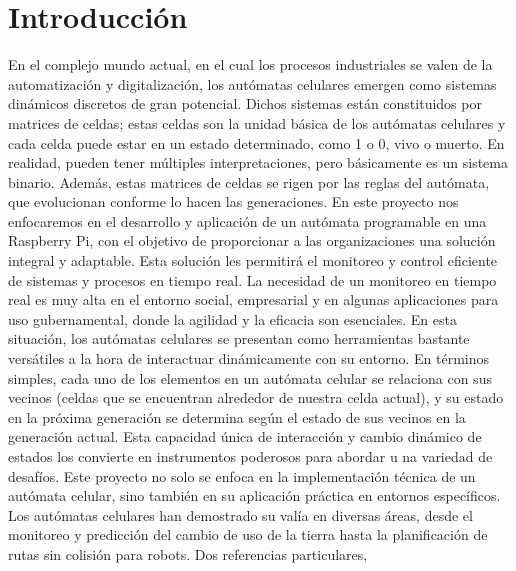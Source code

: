 \section{Introducci\'on}
\label{sec:introduccion}
    En el complejo mundo actual, en el cual los procesos industriales se valen de la automatizaci\'on y digitalizaci\'on, 
        los aut\'omatas celulares emergen como sistemas din\'amicos discretos de gran potencial. Dichos sistemas est\'an 
        constituidos por matrices de celdas; estas celdas son la unidad b\'asica de los aut\'omatas celulares y cada celda 
        puede estar en un estado determinado, como 1 o 0, vivo o muerto. En realidad, pueden tener m\'ultiples 
        interpretaciones, pero b\'asicamente es un sistema binario. Adem\'as, estas matrices de celdas se rigen 
        por las reglas del aut\'omata, que evolucionan conforme lo hacen las generaciones. En este proyecto nos 
        enfocaremos en el desarrollo y aplicaci\'on de un aut\'omata programable en una Raspberry Pi, con el objetivo 
        de proporcionar a las organizaciones una soluci\'on integral y adaptable. Esta soluci\'on les permitir\'a el 
        monitoreo y control eficiente de sistemas y procesos en tiempo real.
    \vskip 0.5cm
    La necesidad de un monitoreo en tiempo real es muy alta en el entorno social, empresarial y en algunas 
        aplicaciones para uso gubernamental, donde la agilidad y la eficacia son esenciales. En esta situaci\'on, 
        los aut\'omatas celulares se presentan como herramientas bastante vers\'atiles a la hora de interactuar 
        din\'amicamente con su entorno. En t\'erminos simples, cada uno de los elementos en un aut\'omata celular se 
        relaciona con sus vecinos (celdas que se encuentran alrededor de nuestra celda actual), y su estado en 
        la pr\'oxima generaci\'on se determina seg\'un el estado de sus vecinos en la generaci\'on actual. Esta capacidad 
        \'unica de interacci\'on y cambio din\'amico de estados los convierte en instrumentos poderosos para abordar u
        na variedad de desaf\'ios.
    \vskip 0.5cm
    Este proyecto no solo se enfoca en la implementaci\'on t\'ecnica de un aut\'omata celular, sino tambi\'en 
        en su aplicaci\'on pr\'actica en entornos espec\'ificos. Los aut\'omatas celulares han demostrado su 
        val\'ia en diversas \'areas, desde el monitoreo y predicci\'on del cambio de uso de la tierra hasta 
        la planificaci\'on de rutas sin colisi\'on para robots. Dos referencias particulares, \cite{Tzionas1997} 
